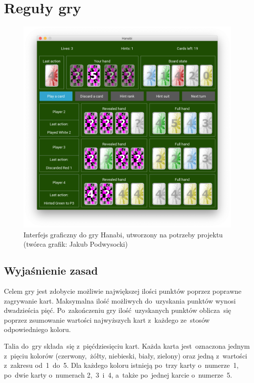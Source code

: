 \documentclass[declaration,shortabstract,inz]{iithesis}
\begin{document}
\chapter{Reguły gry}

\begin{figure}[ht!]
	\centering
	\captionsetup{format=hang}
	\includegraphics[width=\textwidth,height=\textheight,keepaspectratio]{gui.png}
	\caption[Caption]{Interfejs graficzny do gry Hanabi, utworzony na potrzeby projektu (twórca grafik: Jakub Podwysocki)}
	\label{fig:gui}
\end{figure}

\section{Wyjaśnienie zasad}

Celem gry jest zdobycie możliwie największej ilości punktów poprzez poprawne zagrywanie kart. Maksymalna ilość możliwych do~uzyskania punktów wynosi dwadzieścia pięć. Po~zakończeniu gry ilość uzyskanych punktów oblicza~się poprzez zsumowanie wartości najwyższych kart z~każdego ze~stosów odpowiedniego koloru.

Talia do~gry składa~się z~pięćdziesięciu kart. Każda karta jest~oznaczona jednym z~pięciu kolorów (czerwony, żółty, niebieski, biały, zielony) oraz jedną z~wartości z~zakresu od~1~do~5. Dla każdego koloru istnieją po~trzy karty o~numerze~1, po~dwie karty o~numerach 2,~3~i~4, a~także po~jednej karcie o~numerze~5.
\end{document}
